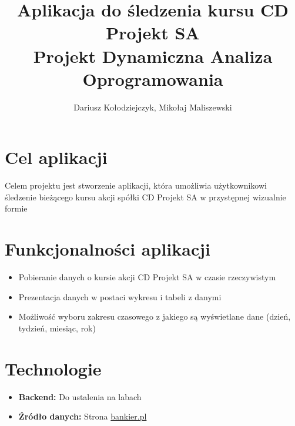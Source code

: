 \documentclass{article}
\begin{document}
		\title{Aplikacja do śledzenia kursu CD Projekt SA \\ Projekt Dynamiczna Analiza Oprogramowania}
	\author{Dariusz Kołodziejczyk, Mikołaj Maliszewski}
	\maketitle
	\section{Cel aplikacji}
	\noindent Celem projektu jest stworzenie aplikacji, która umożliwia użytkownikowi śledzenie bieżącego kursu akcji spółki CD Projekt SA w przystępnej wizualnie formie
	\section{Funkcjonalności aplikacji}
	\begin{itemize}
		\item Pobieranie danych o kursie akcji CD Projekt SA w czasie rzeczywistym
		\item Prezentacja danych w postaci wykresu i tabeli z danymi
		\item Możliwość wyboru zakresu czasowego z jakiego są wyświetlane dane (dzień, tydzień, miesiąc, rok)
	\end{itemize}
	\section{Technologie}
	\begin{itemize}
		\item \textbf {Backend:} Do ustalenia na labach
		\item \textbf{Źródło danych:} Strona \href{https://www.bankier.pl/inwestowanie/profile/quote.html?symbol=CDPROJEKT}{bankier.pl}
	\end{itemize}
	
\end{document}
